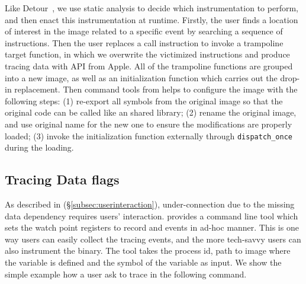 Like Detour~\cite{hunt1999detours}, we use static analysis to decide which
instrumentation to perform, and then enact this instrumentation at runtime.
Firstly, the user finds a location of interest in the image related to a
specific event by searching a sequence of instructions. Then the user replaces a
call instruction to invoke a trampoline target function, in which we overwrite
the victimized instructions and produce tracing data with API from Apple.
All of the trampoline functions are grouped into a new image, as well as an
initialization function which carries out the drop-in replacement. Then command
tools from \xxx helps to configure the image with the following steps: (1)
re-export all symbols from the original image so that the original code can be
called like an shared library; (2) rename the original image, and use original
name for the new one to ensure the modifications are properly loaded; (3) invoke
the initialization function externally through \texttt{dispatch\_once} during
the loading.



\subsection{Tracing Data flags} \label{subsec:tcp}
As described in (\S\ref{subsec:userinteraction}), under-connection due
to the missing data dependency requires users' interaction. \xxx
provides a command line tool which sets the watch point registers to record
\dataflagwrite and \dataflagread events in ad-hoc manner. This is one
way users can easily collect the tracing events, and the more tech-savvy users
can also instrument the binary. The tool takes the process id, path to image
where the variable is defined and the symbol of the variable as input. We
show the simple example how a user ask \xxx to trace  in the
following command.

